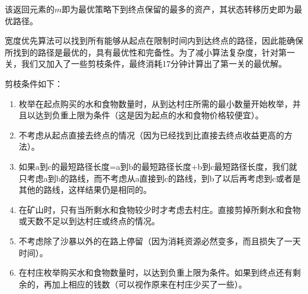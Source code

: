 \documentclass[withoutpreface,bwprint]{cumcmthesis} %
\begin{document}
该返回元素的\(m\)即为最优策略下到终点保留的最多的资产，其状态转移历史即为最优路径。

宽度优先算法可以找到所有能够从起点在限制时间内到达终点的路径，因此能确保所找到的路径是最优的，具有最优性和完备性。为了减小算法复杂度，针对第一关，我们又加入了一些剪枝条件，最终消耗17分钟计算出了第一关的最优解。

剪枝条件如下：
\begin{enumerate}
    \item 枚举在起点购买的水和食物数量时，从到达村庄所需的最小数量开始枚举，并且以达到负重上限为条件（这是因为起点的水和食物价格较便宜）。
    \item 不考虑从起点直接去终点的情况（因为已经找到比直接去终点收益更高的方法）。
    \item 如果a到c的最短路径长度=a到b的最短路径长度+b到c最短路径长度，我们就只考虑a到b的路线，而不考虑从a直接到c的路线，到b了以后再考虑到c或者是其他的路线，这样结果仍是相同的。
    \item 在矿山时，只有当所剩水和食物较少时才考虑去村庄。直接剪掉所剩水和食物或天数不足以到达村庄或终点的情况。
    \item 不考虑除了沙暴以外的在路上停留（因为消耗资源必然变多，而且损失了一天时间）。
    \item 在村庄枚举购买水和食物数量时，以达到负重上限为条件。如果到终点还有剩余的，再加上相应的钱数（可以视作原来在村庄少买了一些）。
\end{enumerate}
\end{document}

